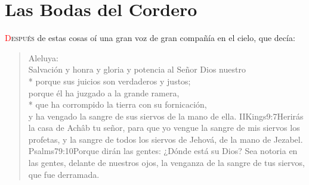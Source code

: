 
\chapter{Las Bodas del Cordero}
\lettrine[lines=3,lraise=0.4]{\textcolor{red}{D}}{espués} de estas cosas oí una gran voz de gran compañía%
 en el cielo, que decía:
\zz \begin{verse}
Aleluya:\\
Salvación y honra y gloria y potencia al Señor Dios nuestro\\*\vin
{}porque sus juicios son verdaderos y justos;\\
porque él ha juzgado a la grande ramera,\\*\vin
que ha corrompido la tierra con su fornicación,\\
y ha vengado la sangre de sus siervos de la mano de ella.%
				{IIKings}{9:7}{Herirás la casa de Achâb tu señor, para que yo vengue la sangre de mis siervos los profetas, y la sangre de todos los siervos de Jehová, de la mano de Jezabel.}%
				{Psalms}{79:10}{Porque dirán las gentes: ¿Dónde está su Dios? Sea notoria en las gentes, delante de nuestros ojos, la venganza de la sangre de tus siervos, que fue derramada.}
\end{verse}

